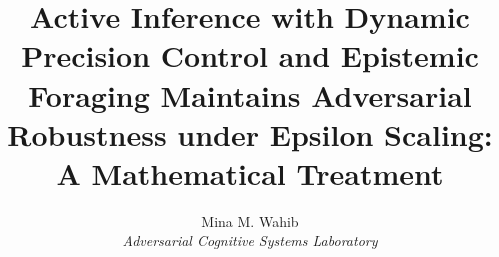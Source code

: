 \documentclass[10pt,journal,compsoc,twocolumn]{IEEEtran}
\begin{document}
\title{Active Inference with Dynamic Precision Control and Epistemic Foraging Maintains Adversarial Robustness under Epsilon Scaling: A Mathematical Treatment}

\author{Mina M. Wahib \\
\textit{Adversarial Cognitive Systems Laboratory}}

\maketitle


\end{document}
